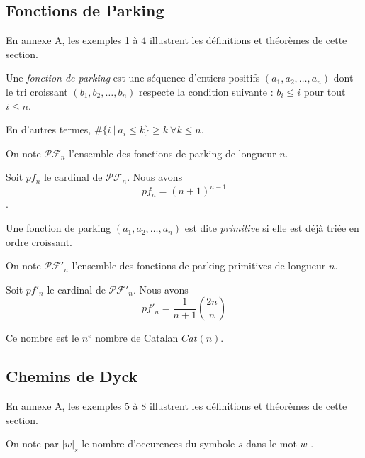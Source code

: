 \subsection{Fonctions de Parking}


En annexe A, les exemples 1 à 4 illustrent les définitions et théorèmes
de cette section.

\begin{definition}
    Une \emph{fonction de parking} est une séquence d'entiers positifs
    $(a_1, a_2, \ldots, a_n)$ dont le tri croissant
    $(b_1, b_2, \ldots, b_n)$ respecte la condition suivante :
    $b_i \leqslant i$ pour tout $i \leqslant n$.
\end{definition}

En d'autres termes, $\#\{i\ |\ a_i \leqslant k\} \geqslant k\ 
\forall k \leqslant n$.

On note $\mathcal{PF}_n$ l'ensemble des fonctions de parking de longueur $n$.

\begin{theorem}
    Soit $pf_n$ le cardinal de $\mathcal{PF}_n$.
    Nous avons $$pf_n = (n + 1)^{n-1}$$.
\end{theorem}

\begin{definition}
    Une fonction de parking $(a_1, a_2, \ldots, a_n)$ est dite
    \emph{primitive} si elle est déjà triée en ordre croissant.    
\end{definition}

On note $\mathcal{PF'}_n$ l'ensemble des fonctions de parking primitives
de longueur $n$.

\begin{theorem}[Stanley, 1999]
    Soit $pf'_n$ le cardinal de $\mathcal{PF'}_n$.
    Nous avons $$pf'_n = \frac{1}{n + 1} \binom{2n}{n}$$
\end{theorem}

Ce nombre est le $n^{e}$ nombre de Catalan $Cat(n)$.

\subsection{Chemins de Dyck}

En annexe A, les exemples 5 à 8 illustrent les définitions et théorèmes
de cette section.

\begin{notation}
    On note par $|w|_s$ le nombre d'occurences du symbole $s$ dans
    le mot $w$ .
\end{notation}

